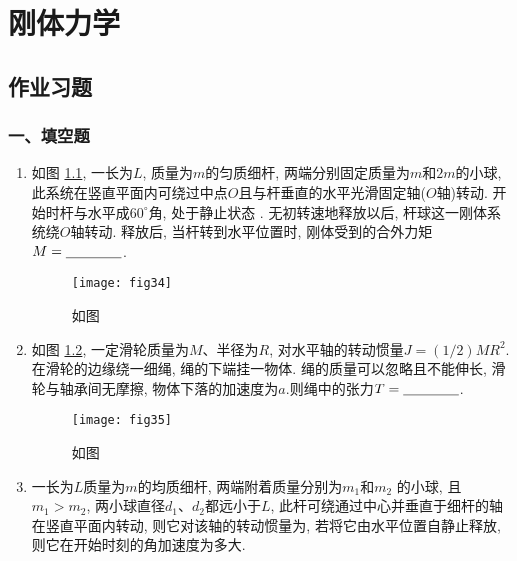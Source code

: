 \chapter{刚体力学}
\section{作业习题}
\subsection*{一、填空题}
\begin{enumerate}
    \item 如图 \ref{fig:34}, 一长为$L$, 质量为$m$的匀质细杆, 两端分别固定质量为$m$和$2m$的小球,
    此系统在竖直平面内可绕过中点$O$且与杆垂直的水平光滑固定轴($O$轴)转动. 
    开始时杆与水平成$60^\circ$角, 处于静止状态 . 
    无初转速地释放以后, 杆球这一刚体系统绕$O$轴转动. 
    释放后, 当杆转到水平位置时, 刚体受到的合外力矩$M=\nl$.
    \begin{figure}[H]
        \centering
        \texttt{[image: fig34]}
            \caption{如图}\label{fig:34}
    \end{figure}
    \item 如图 \ref{fig:35}, 一定滑轮质量为$M$、半径为$R$, 对水平轴的转动惯量$J=(1/2)MR^2$.
    在滑轮的边缘绕一细绳, 绳的下端挂一物体. 
    绳的质量可以忽略且不能伸长, 滑轮与轴承间无摩擦, 
    物体下落的加速度为$a$.则绳中的张力$T=\nl$.
    \begin{figure}[H]
        \centering
        \texttt{[image: fig35]}
            \caption{如图}\label{fig:35}
    \end{figure}
    \item 一长为$L$质量为$m$的均质细杆, 两端附着质量分别为$m_1$和$m_2$
    的小球, 且$m_1>m_2$, 两小球直径$d_1$、$d_2$都远小于$L$, 
    此杆可绕通过中心并垂直于细杆的轴在竖直平面内转动, 
    则它对该轴的转动惯量为\nl, 若将它由水平位置自静止释放, 
    则它在开始时刻的角加速度为多大\nl.


\end{enumerate}
